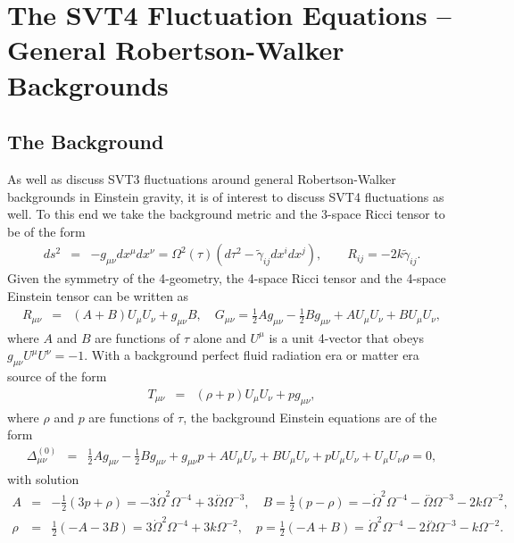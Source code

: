 \documentclass[aps,onecolumn,10pt]{revtex4}
\numberwithin{equation}{section}
\numberwithin{equation}{section}
\begin{document}
\section{The SVT4 Fluctuation Equations --  General Robertson-Walker Backgrounds}
\label{S12}
\subsection{The Background}

As well as discuss SVT3 fluctuations around general Robertson-Walker backgrounds in Einstein gravity,  it is of interest to discuss SVT4 fluctuations  as well. To this end we take the background metric and the 3-space Ricci tensor to be of the form 
%
\begin{eqnarray}
ds^2 &=&-g_{\mu\nu}dx^{\mu}dx^{\nu}=\Omega^2(\tau)\left(d\tau^2 -\tilde{\gamma}_{ij} dx^i dx^j\right),\qquad R_{ij} = -2k \tilde{\gamma}_{ij}.
\label{12.1}
\end{eqnarray}
%
Given the symmetry of the 4-geometry, the 4-space Ricci tensor and the 4-space Einstein tensor can be written as 
%
\begin{eqnarray}
R_{\mu\nu} &=& (A+B)U_\mu U_\nu + g_{\mu\nu}B,\quad G_{\mu\nu}= \tfrac{1}{2} A g_{\mu \nu } -  \tfrac{1}{2} B g_{\mu \nu } + A U_{\mu } U_{\nu } + B U_{\mu } U_{\nu },
\label{12.2}
\end{eqnarray}
%
where $A$ and $B$ are functions of $\tau$ alone and $U^{\mu}$ is a unit 4-vector that obeys $g_{\mu\nu}U^{\mu}U^{\nu}=-1$. With a background perfect fluid radiation era or matter era source of the form
%
\begin{eqnarray} 
T_{\mu\nu} &=& (\rho+p)U_\mu U_\nu +  p g_{\mu\nu},
\label{12.3}
\end{eqnarray}
%
where $\rho$ and $p$ are functions of $\tau$, the background Einstein equations are of the form
%
\begin{eqnarray}
\Delta_{\mu\nu}^{(0)}&=&\tfrac{1}{2} A g_{\mu \nu } -  \tfrac{1}{2} B g_{\mu \nu } + g_{\mu \nu } p + A U_{\mu } U_{\nu } + B U_{\mu } U_{\nu } + p U_{\mu } U_{\nu } + U_{\mu } U_{\nu } \rho=0,
\label{12.4}
\end{eqnarray}
%
with solution 
%
\begin{eqnarray}
A &=& -\tfrac{1}{2} (3p+\rho)= -3 \dot{\Omega}^2 \Omega^{-4} + 3 \overset{..}{\Omega} \Omega^{-3}, \quad B= \tfrac{1}{2}(p-\rho)=- \dot{\Omega}^2 \Omega^{-4} -  \overset{..}{\Omega} \Omega^{-3} - 2 k \Omega^{-2}, 
\nonumber\\
\rho &=& \tfrac{1}{2} (- A - 3 B)= 3 \dot{\Omega}^2 \Omega^{-4} + 3 k \Omega^{-2},\quad p = \tfrac{1}{2} (- A + B)
= \dot{\Omega}^2 \Omega^{-4} - 2 \overset{..}{\Omega} \Omega^{-3} -  k \Omega^{-2}.
\label{12.5}
\end{eqnarray}
%
\end{document}
